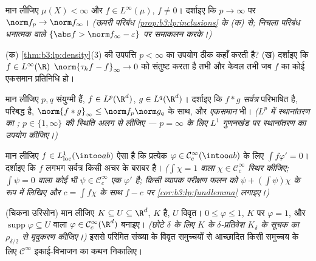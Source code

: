 \begin{exercise}[$\star\star$]\label{exo:b3:lp:4}
मान लीजिए $\mu(X) < \infty$ और $f \in L^\infty(\mu)$, $f \neq 0$। दर्शाइए कि $p \to \infty$ पर $\norm f_p \to \norm f_\infty$।
\emph{(ऊपरी परिबंध \cref{prop:b3:lp:inclusions} के (क) से; निचला परिबंध धनात्मक  वाले
$\{\abs f > \norm f_\infty -
\varepsilon\}$ पर समाकलन करके।)}
\end{exercise}

\begin{exercise}[$\star\star$]\label{exo:b3:lp:5}
(क) \cref{thm:b3:lp:density}(3) की उपपत्ति $p < \infty$ का उपयोग ठीक कहाँ करती है?
(ख) दर्शाइए कि $f \in L^\infty(\R)$ $\norm{\tau_hf -
f}_\infty \to 0$ को संतुष्ट करता है तभी और केवल तभी जब
$f$ का कोई एकसमान  प्रतिनिधि हो।
\end{exercise}

\begin{exercise}[$\star\star$]\label{exo:b3:lp:6}
मान लीजिए $p, q$ संयुग्मी हैं, $f \in L^p(\R^d)$, $g \in
L^q(\R^d)$। दर्शाइए कि $f * g$
\emph{सर्वत्र} परिभाषित है, परिबद्ध है, $\norm{f*g}_\infty \leq \norm f_p\norm g_q$ के साथ, और
\emph{एकसमान } भी। \emph{($L^p$ में स्थानांतरण का ;
$p \in \{1, \infty\}$ की स्थिति अलग से लीजिए --- $p =
\infty$ के लिए $L^1$ गुणनखंड पर
स्थानांतरण  का उपयोग कीजिए।)}
\end{exercise}

\begin{exercise}[$\star\star$]\label{exo:b3:lp:7}
मान लीजिए $f \in L^1_{\mathrm{loc}}(\intoo ab)$ ऐसा है कि प्रत्येक $\varphi \in \mathcal
C^\infty_c(\intoo ab)$ के लिए $\int f\varphi' = 0$। दर्शाइए कि
$f$ लगभग सर्वत्र किसी अचर के बराबर है। \emph{($\int\chi = 1$ वाला $\chi \in \mathcal C_c^\infty$
स्थिर कीजिए; $\int\psi = 0$ वाला कोई भी $\psi \in \mathcal C_c^\infty$ एक $\varphi'$ है; किसी व्यापक
परीक्षण फलन को $\psi + (\int\psi)\chi$ के रूप में लिखिए और $c = \int
f\chi$ के साथ $f - c$ पर
\cref{cor:b3:lp:fundlemma} लगाइए।)}
\end{exercise}

\begin{exercise}[$\star\star\star$]\label{exo:b3:lp:8}
(चिकना उरिसोन) मान लीजिए $K \subseteq U \subseteq \R^d$, $K$  है, $U$ विवृत।
$0 \leq \varphi \leq 1$, $K$ पर $\varphi = 1$, और $\operatorname{supp}\varphi \subseteq U$ वाला $\varphi \in \mathcal
C^\infty_c(\R^d)$ बनाइए। \emph{(छोटे
$\delta$ के लिए $K$ के $\delta$-प्रतिवेश $K_\delta$ के सूचक का $\rho_{\delta/2}$ से
मृदुकरण कीजिए।)} इससे परिमित संख्या के विवृत समुच्चयों से आच्छादित
किसी  समुच्चय के लिए $\mathcal C^\infty$ इकाई-विभाजन का कथन निकालिए।
\end{exercise}

